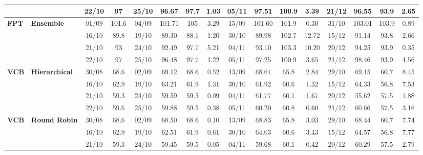 \begin{table}[!h]
\begin{tabular}{llcc|cccc|cccc|cccc}
&
& 22/10 & 97 & 25/10 & 96.67 & 97.7 & 1.03 & 05/11 & 97.51 & 100.9 & 3.39 & 21/12 & 96.55 & 93.9 & 2.65 \\
\midrule



\multirow{4}{*}{\textbf{FPT}} 
& \textbf{Ensemble}
& 01/09 & 101.6 & 04/09 & 101.71 & 105 & 3.29 & 15/09 & 101.60 & 101.9 & 0.30 & 31/10 & 103.01 & 103.9 & 0.89 \\

&
& 16/10 & 89.8 & 19/10 & 89.30 & 88.1 & 1.20 & 30/10 & 89.98 & 102.7 & 12.72 & 15/12 & 91.14 & 93.8 & 2.66 \\

&
& 21/10 & 93 & 24/10 & 92.49 & 97.7 & 5.21 & 04/11 & 93.10 & 103.3 & 10.20 & 20/12 & 94.25 & 93.9 & 0.35 \\

&
& 22/10 & 97 & 25/10 & 96.48 & 97.7 & 1.22 & 05/11 & 97.25 & 100.9 & 3.65 & 21/12 & 98.46 & 93.9 & 4.56 \\
\midrule




\multirow{4}{*}{\textbf{VCB}} 
& \textbf{Hierarchical}
& 30/08 & 68.6 & 02/09 & 69.12 & 68.6 & 0.52 & 13/09 & 68.64 & 65.8 & 2.84 & 29/10 & 69.15 & 60.7 & 8.45 \\

&
& 16/10 & 62.9 & 19/10 & 63.21 & 61.9 & 1.31 & 30/10 & 61.92 & 60.6 & 1.32 & 15/12 & 64.33 & 56.8 & 7.53 \\

&
& 21/10 & 59.3 & 24/10 & 59.59 & 59.5 & 0.09 & 04/11 & 61.77 & 60.1 & 1.67 & 20/12 & 55.62 & 57.5 & 1.88 \\

&
& 22/10 & 59.6 & 25/10 & 59.88 & 59.5 & 0.38 & 05/11 & 60.20 & 60.8 & 0.60 & 21/12 & 60.66 & 57.5 & 3.16 \\
\midrule


\multirow{4}{*}{\textbf{VCB}} 
& \textbf{Round Robin}
& 30/08 & 68.6 & 02/09 & 68.50 & 68.6 & 0.10 & 13/09 & 68.83 & 65.8 & 3.03 & 29/10 & 68.44 & 60.7 & 7.74 \\

&
& 16/10 & 62.9 & 19/10 & 62.51 & 61.9 & 0.61 & 30/10 & 64.03 & 60.6 & 3.43 & 15/12 & 64.57 & 56.8 & 7.77 \\

&
& 21/10 & 59.3 & 24/10 & 59.45 & 59.5 & 0.05 & 04/11 & 59.68 & 60.1 & 0.42 & 20/12 & 60.29 & 57.5 & 2.79 \\


\end{tabular}
\end{table}
